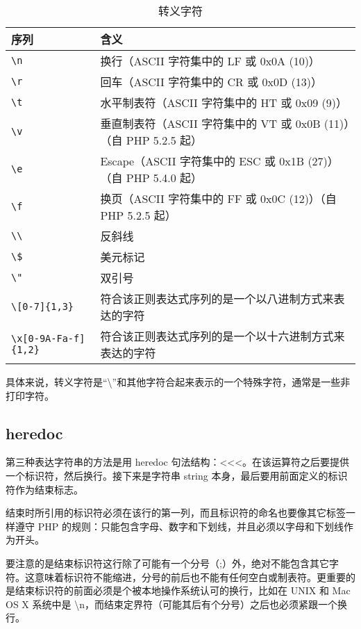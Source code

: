 \begin{table}[!ht]
\centering
\caption{转义字符}
\begin{tabular}{|l|l|}
\hline
序列	&含义\\
\hline
\texttt{\textbackslash n}	&换行（ASCII 字符集中的 LF 或 0x0A (10)）\\
\hline
\texttt{\textbackslash r}	&回车（ASCII 字符集中的 CR 或 0x0D (13)）\\
\hline
\texttt{\textbackslash t}	&水平制表符（ASCII 字符集中的 HT 或 0x09 (9)）\\
\hline
\texttt{\textbackslash v}	&垂直制表符（ASCII 字符集中的 VT 或 0x0B (11)）（自 PHP 5.2.5 起）\\
\hline
\texttt{\textbackslash e}	&Escape（ASCII 字符集中的 ESC 或 0x1B (27)）（自 PHP 5.4.0 起）\\
\hline
\texttt{\textbackslash f}	&换页（ASCII 字符集中的 FF 或 0x0C (12)）（自 PHP 5.2.5 起）\\
\hline
\texttt{\textbackslash \textbackslash}	&反斜线\\
\hline
\texttt{\textbackslash \$}	&美元标记\\
\hline
\texttt{\textbackslash "}	&双引号\\
\hline
\texttt{\textbackslash [0-7]\{1,3\}}	 &符合该正则表达式序列的是一个以八进制方式来表达的字符\\
\hline
\texttt{\textbackslash x[0-9A-Fa-f]\{1,2\}}	 &符合该正则表达式序列的是一个以十六进制方式来表达的字符\\
\hline
\end{tabular}
\end{table}


具体来说，转义字符是“\textbackslash”和其他字符合起来表示的一个特殊字符，通常是一些非打印字符。






\subsection{heredoc}


第三种表达字符串的方法是用 heredoc 句法结构：<\/<\/<。在该运算符之后要提供一个标识符，然后换行。接下来是字符串 string 本身，最后要用前面定义的标识符作为结束标志。

结束时所引用的标识符必须在该行的第一列，而且标识符的命名也要像其它标签一样遵守 PHP 的规则：只能包含字母、数字和下划线，并且必须以字母和下划线作为开头。

要注意的是结束标识符这行除了可能有一个分号（;）外，绝对不能包含其它字符。这意味着标识符不能缩进，分号的前后也不能有任何空白或制表符。更重要的是结束标识符的前面必须是个被本地操作系统认可的换行，比如在 UNIX 和 Mac OS X 系统中是 \textbackslash n，而结束定界符（可能其后有个分号）之后也必须紧跟一个换行。

